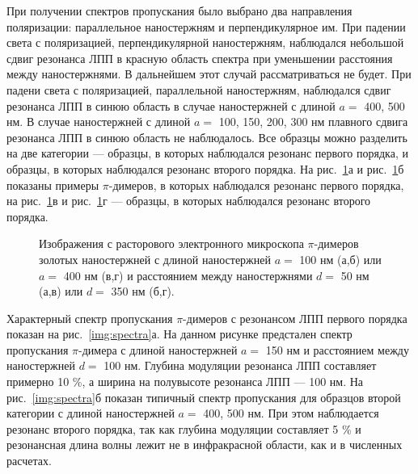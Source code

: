 При получении спектров пропускания было выбрано два направления поляризации: параллельное наностержням и перпендикулярное им. При падении света с поляризацией, перпендикулярной наностержням, наблюдался небольшой сдвиг резонанса ЛПП в красную область спектра при уменьшении расстояния между наностержнями. В дальнейшем этот случай рассматриваться не будет. При падени света с поляризацией, параллельной наностержням, наблюдался сдвиг резонанса ЛПП в синюю область в случае наностержней с длиной $ a = $ 400, 500 нм. В случае наностержней с длиной $ a = $ 100, 150, 200, 300 нм плавного сдвига резонанса ЛПП в синюю область не наблюдалось.
Все образцы можно разделить на две категории --- образцы, в которых наблюдался резонанс первого порядка, и образцы, в которых наблюдался резонанс второго порядка. На рис.~\ref{img:samples}а и рис.~\ref{img:samples}б показаны примеры $ \pi $-димеров, в которых наблюдался резонанс первого порядка, на рис.~\ref{img:samples}в и рис.~\ref{img:samples}г --- образцы, в которых наблюдался резонанс второго порядка.
\begin{figure}[!h]
\caption{Изображения с расторового электронного микроскопа $ \pi $-димеров золотых наностержней с длиной наностержней $ a = $ 100 нм (а,б) или $ a = $ 400 нм (в,г) и расстоянием между наностержнями $ d = $ 50 нм (а,в) или $ d = $ 350 нм (б,г).}
\label{img:samples}
\end{figure}
Характерный спектр пропускания $ \pi $-димеров с резонансом ЛПП первого порядка показан на рис.~\ref{img:spectra}а. На данном рисунке предстален спектр пропускания $ \pi$-димера с длиной наностержней $ a = $ 150 нм и расстоянием между наностержней $ d = $ 100 нм. Глубина модуляции резонанса ЛПП составляет примерно 10 \%, а ширина на полувысоте резонанса ЛПП --- 100 нм. На рис.~\ref{img:spectra}б показан типичный спектр пропускания для образцов второй категории с длиной наностержней $ a = $ 400, 500 нм. При этом наблюдается резонанс второго порядка, так как глубина модуляции составляет 5 \% и резонансная длина волны лежит не в инфракрасной области, как и в численных расчетах.
